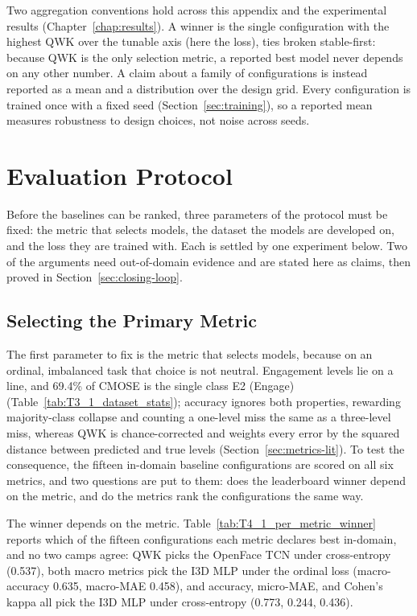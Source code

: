 \documentclass[../main.tex]{subfiles}
\begin{document}
Two aggregation conventions hold across this appendix and the experimental results (Chapter~\ref{chap:results}). A winner is the single configuration with the highest QWK over the tunable axis (here the loss), ties broken stable-first: because QWK is the only selection metric, a reported best model never depends on any other number. A claim about a family of configurations is instead reported as a mean and a distribution over the design grid. Every configuration is trained once with a fixed seed (Section~\ref{sec:training}), so a reported mean measures robustness to design choices, not noise across seeds.

\FloatBarrier
\section{Evaluation Protocol}
\label{sec:protocol}

Before the baselines can be ranked, three parameters of the protocol must be fixed: the metric that selects models, the dataset the models are developed on, and the loss they are trained with. Each is settled by one experiment below. Two of the arguments need out-of-domain evidence and are stated here as claims, then proved in Section~\ref{sec:closing-loop}.

\subsection{Selecting the Primary Metric}
\label{sec:protocol-metrics}

The first parameter to fix is the metric that selects models, because on an ordinal, imbalanced task that choice is not neutral. Engagement levels lie on a line, and 69.4\% of CMOSE is the single class E2 (Engage) (Table~\ref{tab:T3_1_dataset_stats}); accuracy ignores both properties, rewarding majority-class collapse and counting a one-level miss the same as a three-level miss, whereas QWK is chance-corrected and weights every error by the squared distance between predicted and true levels (Section~\ref{sec:metrics-lit}). To test the consequence, the fifteen in-domain baseline configurations are scored on all six metrics, and two questions are put to them: does the leaderboard winner depend on the metric, and do the metrics rank the configurations the same way.

The winner depends on the metric. Table~\ref{tab:T4_1_per_metric_winner} reports which of the fifteen configurations each metric declares best in-domain, and no two camps agree: QWK picks the OpenFace TCN under cross-entropy (0.537), both macro metrics pick the I3D MLP under the ordinal loss (macro-accuracy 0.635, macro-MAE 0.458), and accuracy, micro-MAE, and Cohen's kappa all pick the I3D MLP under cross-entropy (0.773, 0.244, 0.436).

\end{document}
